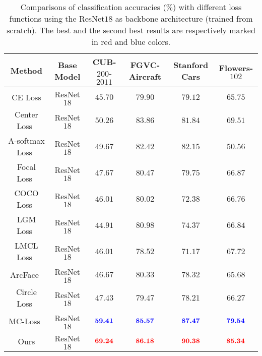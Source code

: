\documentclass[journal]{IEEEtran}
\def\tblue#1{\textcolor[rgb]{0,0,1}{#1}} %
\def\tred#1{\textcolor[rgb]{1,0,0}{#1}}  %
\begin{document}
\begin{table*}[!t]
  \centering
  \small
  \caption{Comparisons of classification accuracies ($\%$) with different loss functions using the ResNet$18$ as backbone architecture (trained from scratch). The best and the second best results are respectively marked in red and blue colors.}
    \begin{adjustbox}{width=0.8\linewidth,center}
   \Huge   %
    \begin{tabular}{|c|c|c|c|c|c|}
    \hline
    Method     & Base Model             & CUB-$200$-$2011$   & FGVC-Aircraft      & Stanford Cars     & Flowers-$102$ \\
    \hline
    \hline
    CE Loss  &  ResNet$18$   & $45.70$  &  $79.90$   &  $79.12$  & $65.75$  \\
Center Loss~\cite{wen2016discriminative} &   ResNet$18$&  $50.26$  & $83.86$  & $81.84$    & $69.51$  \\
A-softmax Loss~\cite{liu2017sphereface}  &  ResNet$18$    & $49.67$  & $82.42$ &  $82.15$    & $50.56 $ \\
Focal Loss~\cite{lin2017focal}  &  ResNet$18$    & $47.67$ & $80.47$  & $79.75$& $66.87$  \\
COCO Loss~\cite{liu2017rethinking} &  ResNet$18$ & $46.01$  & $80.02$& $72.38$& $66.76$ \\
LGM Loss~\cite{wan2018rethinking} &  ResNet$18$ &  $44.91$&$80.98$&  $74.37$& $66.84$  \\
LMCL Loss~\cite{wang2018cosface} & ResNet$18$& $46.01$&  $78.52$&  $71.17$ &  $67.72$ \\
ArcFace~\cite{deng2019arcface}& ResNet$18$    & $46.67$& $80.33$& $78.32$& $65.68$\\
Circle Loss~\cite{sun2020circle}& ResNet$18$& $47.43$& $79.47$& $78.21$& $66.27$\\
MC-Loss~\cite{chang2020mc}&   ResNet$18$& $\textbf{\tblue{59.41}}$&  $\textbf{\tblue{85.57}}$& $\textbf{\tblue{87.47}}$ &  $\textbf{\tblue{79.54}}$ \\
    \hline
    \hline
Ours &  ResNet$18$ & $\textbf{\tred{69.24}}$ &  $\textbf{\tred{ 86.18}}$ & $\textbf{\tred{ 90.38}} $& $\textbf{\tred{ 85.34}} $\\
    \hline
    \end{tabular}%
           \end{adjustbox}
  \label{tab:results_2}%
\end{table*}%
\end{document}

